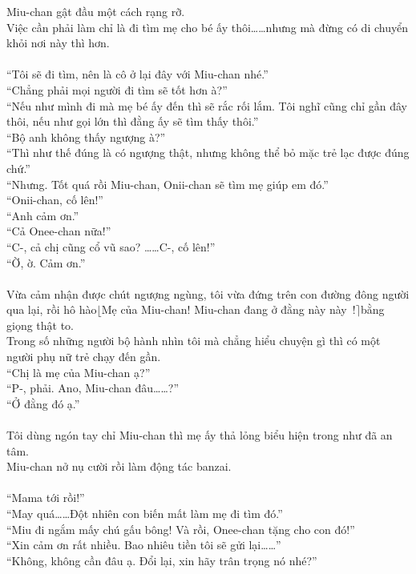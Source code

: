 \documentclass[12pt,a4paper, twosides]{book}
\begin{document}
Miu-chan gật đầu một cách rạng rỡ.\\
Việc cần phải làm chỉ là đi tìm mẹ cho bé ấy thôi……nhưng mà đừng có di chuyển khỏi nơi này thì hơn.\\
\\
“Tôi sẽ đi tìm, nên là cô ở lại đây với Miu-chan nhé.”\\
“Chẳng phải mọi người đi tìm sẽ tốt hơn à?”\\
“Nếu như mình đi mà mẹ bé ấy đến thì sẽ rắc rối lắm. Tôi nghĩ cũng chỉ gần đây thôi, nếu như gọi lớn thì đằng ấy sẽ tìm thấy thôi.”\\
“Bộ anh không thấy ngượng à?”\\
“Thì như thế đúng là có ngượng thật, nhưng không thể bỏ mặc trẻ lạc được đúng chứ.”\\
“Nhưng. Tốt quá rồi Miu-chan, Onii-chan sẽ tìm mẹ giúp em đó.”\\
“Onii-chan, cố lên!”\\
“Anh cảm ơn.”\\
“Cả Onee-chan nữa!”\\
“C-, cả chị cũng cổ vũ sao? ……C-, cố lên!”\\
“Ờ, ờ. Cảm ơn.”\\
\\
Vừa cảm nhận được chút ngượng ngùng, tôi vừa đứng trên con đường đông người qua lại, rồi hô hào$\lfloor$Mẹ của Miu-chan! Miu-chan đang ở đằng này này~!$\rceil$bằng giọng thật to.\\
Trong số những người bộ hành nhìn tôi mà chẳng hiểu chuyện gì thì có một người phụ nữ trẻ chạy đến gần.\\
“Chị là mẹ của Miu-chan ạ?”\\
“P-, phải. Ano, Miu-chan đâu……?”\\
“Ở đằng đó ạ.”\\
\\
Tôi dùng ngón tay chỉ Miu-chan thì mẹ ấy thả lỏng biểu hiện trong như đã an tâm.\\
Miu-chan nở nụ cười rồi làm động tác banzai.\\
\\
“Mama tới rồi!”\\
“May quá……Đột nhiên con biến mất làm mẹ đi tìm đó.”\\
“Miu đi ngắm mấy chú gấu bông! Và rồi, Onee-chan tặng cho con đó!”\\
“Xin cảm ơn rất nhiều. Bao nhiêu tiền tôi sẽ gửi lại……”\\
“Không, không cần đâu ạ. Đổi lại, xin hãy trân trọng nó nhé?”\\
\end{document}
